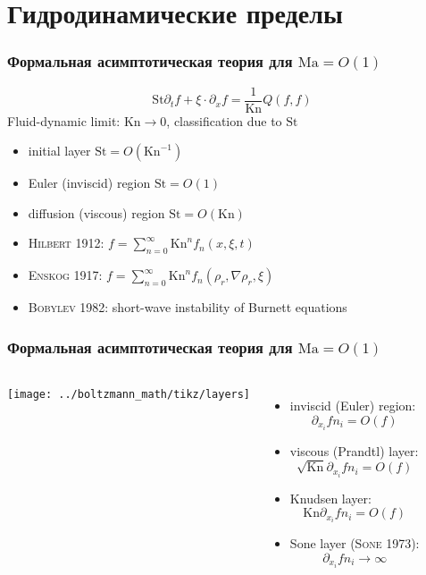 \documentclass[mathserif]{beamer} %
\newcommand{\Kn}{\mathrm{Kn}}
\newcommand{\St}{\mathrm{St}}
\newcommand{\Ma}{\mathrm{Ma}}
\newcommand{\pder}[2][]{\partial_{#2}{#1}}
\newcommand{\OO}[1]{O(#1)}
\newcommand{\Cite}[2][]{\alert{\textsc{#2 #1}}}
\begin{document}
\section{Гидродинамические пределы}

\begin{frame}
    \frametitle{Формальная асимптотическая теория для \(\Ma = \OO{1}\)}
    \[ \St \pder[f]{t} + \xi\cdot\pder[f]{x} = \frac1{\Kn} Q(f,f) \]
    Fluid-dynamic limit: \(\Kn\to0\), classification due to \(\St\)
    \begin{itemize}
        \item initial layer \(\St = \OO{\Kn^{-1}}\)
        \item Euler (inviscid) region \(\St = \OO{1}\)
        \item diffusion (viscous) region \(\St = \OO{\Kn}\)
    \end{itemize}
    \begin{itemize}
        \item \Cite[1912]{Hilbert}: \( f = \sum_{n=0}^\infty \Kn^n f_n(x,\xi,t) \)
        \item \Cite[1917]{Enskog}: \( f = \sum_{n=0}^\infty \Kn^n f_n(\rho_r,\nabla\rho_r,\xi) \)
        \item \Cite[1982]{Bobylev}: short-wave instability of Burnett equations
    \end{itemize}
\end{frame}

\begin{frame}
    \frametitle{Формальная асимптотическая теория для \(\Ma = \OO{1}\)}
   	\begin{columns}
		\begin{center}
		    \vspace{-27pt}
			\texttt{[image: ../boltzmann\_math/tikz/layers]}
		\end{center}
		\vspace{-10pt}
		\begin{itemize}
			\item inviscid (Euler) region: \[ \pder[f]{x_i}n_i = \OO{f} \]
			\item viscous (Prandtl) layer: \[ \sqrt{\Kn}\pder[f]{x_i}n_i = \OO{f} \]
			\item Knudsen layer: \[ \Kn\pder[f]{x_i}n_i = \OO{f} \]
			\item Sone layer (\Cite[1973]{Sone}): \[ \pder[f]{x_i}n_i \to \infty \]
		\end{itemize}
	\end{columns}
\end{frame}
\end{document}
